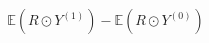 \documentclass[preview]{standalone}
\begin{document}
\begin{align*}
\mathbb{E}( R \odot Y^{(1)} ) - \mathbb{E}( R \odot Y^{(0)} )
\end{align*}
\end{document}

